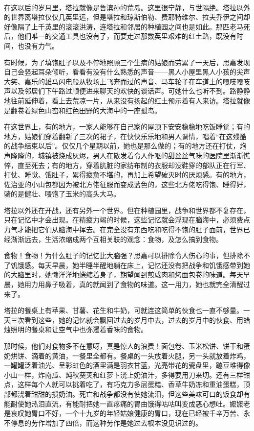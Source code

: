 \par  
\par 在这以后的岁月里，塔拉就像是鲁滨孙的荒岛。这里很宁静，与世隔绝。塔拉以外的世界离塔拉仅仅几英里远，但是塔拉和琼斯伯勒、费耶特维尔、拉夫乔伊之间却好像隔了上千英里的滚滚洪涛，连塔拉和邻居的种植园之间也是如此。那匹老马死后，他们唯一的交通工具也没有了，而要走过那数英里艰难的红土路，既没有时间，也没有力气。
\par 有时候，为了填饱肚子以及不停地照顾三个生病的姑娘而劳累了一天后，思嘉发现自己会竖起耳朵倾听，看看有没有什么熟悉的声音——黑人小屋里黑人小孩的尖声大笑、嘉乐的雄马闪电般从牧场上飞奔而过的声音、马车轮子在车道上的嘎吱嘎吱声以及邻居们下午路过顺便进来聊天的欢快的谈话声。可她什么也听不到。路静静地往前延伸着，看上去荒凉一片，从来没有扬起的红土预示着有人来访。塔拉就像是翻卷着绿色山峦和红色田野的大海中的一座孤岛。
\par 在这世界上，有的地方，一家人能够在自己家的屋顶下安安稳稳地吃饭睡觉；有的地方，姑娘们穿着翻新了三次的裙子，在快快乐乐地和男人调情，唱着“在这残酷的战争结束以后”。仅仅几个星期以前，她也是那么做的；有的地方还在打仗，炮声隆隆的，城镇被烧成灰烬，男人在散发着令人作呕的甜丝丝气味的医院里渐渐憔悴，直至死去；有的地方，穿着肮脏的家纺布制的衣服却没鞋穿的部队正在行军、打仗、睡觉、饿肚子，累得疲惫不堪的，再加上希望破灭时的厌烦感。有的地方，佐治亚的小山包都因为被北方佬征服而变成蓝色的，这些北方佬吃得饱、睡得好，骑的是健壮、喂饱了玉米的高头大马。
\par 塔拉以外还在开战，还有另外一个世界。但在种植园里，战争和世界都不复存在，只在记忆中才会出现。在精疲力竭的时候，这些记忆就会浮现在脑海中，必须费点力气才能把它们从脑海中挥去。在完全没有东西吃和吃得不饱的肚子面前，世界已经渐渐远去，生活浓缩成两个互相关联的观念：食物，及怎么搞到食物。
\par 食物！食物！为什么肚子的记忆比大脑强？思嘉可以排除令人伤心的事，但排除不了饥饿感。每天早晨，她半睡半醒地躺在床上，记忆还没有把战争和饥饿感带到她的大脑里时，她懒洋洋地蜷缩着身子，期望闻到煎咸肉和烤面包卷的味道。每天早晨，她用力用鼻子吸着，真的就闻到了食物的味道。这一用力，她也就完全清醒过来了。
\par 塔拉的餐桌上有苹果、甘薯、花生和牛奶，可就连这简单的伙食也一直不够量。一天三次看到这些，她的记忆就会飘回过去的岁月中去，过去的岁月中的伙食、用蜡烛照明的餐桌和让空气中也弥漫着香味的食物。
\par 那时候，他们对食物多不在意呀，真是惊人的浪费！面包卷、玉米松饼、饼干和蛋奶烘饼、滴着的黄油，一餐里全都有。餐桌的一头放着火腿，另一头就放着炸鸡，一罐罐泛着油光、呈彩虹色的酒里满是羽衣甘蓝，光亮带花的瓷盘里，蹦豆堆得像小山一样，炸南瓜、炖秋葵荚和红萝卜浇上奶油汁，多得要用刀来切。还有三样甜点，这样每个人就可以挑着吃了，有巧克力多层蛋糕、香草牛奶冻和重油蛋糕，顶部都浇着甜甜的掼奶油。死亡和战争都没有使她流泪，但这些美味可口的饭食却有能耐使她热泪直流，有能耐把她一直疼痛的胃由饿得咕咕叫变成恶心想吐。嬷嬷老是哀叹她胃口不好，一个十九岁的年轻姑娘健康的胃口，现在已经被千辛万苦、永不停息的劳作增加了四倍，而这种劳作是她过去根本没见识过的。
